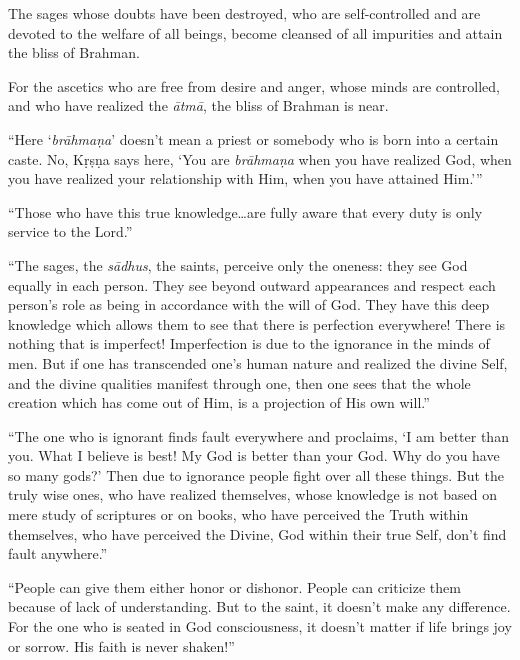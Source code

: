 {The sages whose doubts have been destroyed, who are self-controlled and are devoted to the welfare of all beings, become cleansed of all impurities and attain the bliss of Brahman.}

{For the ascetics who are free from desire and anger, whose minds are controlled, and who have realized the \textit{ātmā}, the bliss of Brahman is near.}

\enquote{Here \enquote{\textit{brāhmaṇa}} doesn’t mean a priest or somebody who is born into a certain caste. No, Kṛṣṇa says here, \enquote{You are \textit{brāhmaṇa} when you have realized God, when you have realized your relationship with Him, when you have attained Him.}}

\enquote{Those who have this true knowledge\ldots are fully aware that every duty is only service to the Lord.}

\enquote{The sages, the \textit{sādhus}, the saints, perceive only the oneness: they see God equally in each person. They see beyond outward appearances and respect each person’s role as being in accordance with the will of God. They have this deep knowledge which allows them to see that there is perfection everywhere! There is nothing that is imperfect! Imperfection is due to the ignorance in the minds of men. But if one has transcended one’s human nature and realized the divine Self, and the divine qualities manifest through one, then one sees that the whole creation which has come out of Him, is a projection of His own will.}

\enquote{The one who is ignorant finds fault everywhere and proclaims, \enquote{I am better than you. What I believe is best! My God is better than your God. Why do you have so many gods?} Then due to ignorance people fight over all these things. But the truly wise ones, who have realized themselves, whose knowledge is not based on mere study of scriptures or on books, who have perceived the Truth within themselves, who have perceived the Divine, God within their true Self, don’t find fault anywhere.}

\enquote{People can give them either honor or dishonor. People can criticize them because of lack of understanding. But to the saint, it doesn’t make any difference. For the one who is seated in God consciousness, it doesn’t matter if life brings joy or sorrow. His faith is never shaken!}


